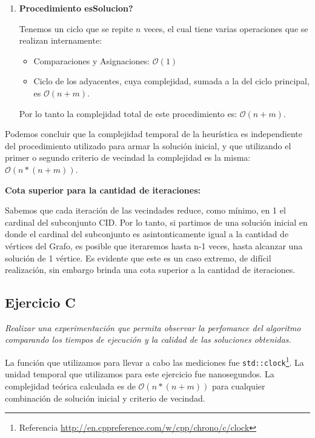 \begin{enumerate}
  \item \textbf{Procedimiento esSolucion?}

    Tenemos un ciclo que se repite $n$ veces, el cual tiene varias operaciones que se realizan internamente:
  \begin{itemize}
    \item Comparaciones y Asignaciones: $\mathcal{O}(1)$
    \item Ciclo de los adyacentes, cuya complejidad, sumada a la del ciclo principal, es $\mathcal{O}(n + m)$.
  \end{itemize}
  Por lo tanto la complejidad total de este procedimiento es: $\mathcal{O}(n + m)$.

\end{enumerate}

Podemos concluir que la complejidad temporal de la heurística es independiente del procedimiento utilizado para armar la solución inicial, y que utilizando el primer o segundo criterio de vecindad la complejidad es la misma: $\mathcal{O}(n*(n + m))$.\\

\medskip

\textbf{Cota superior para la cantidad de iteraciones:}
\medskip

Sabemos que cada iteración de las vecindades reduce, como mínimo, en 1 el cardinal del subconjunto CID. Por lo tanto, si partimos de una solución inicial en donde el cardinal del subconjunto es asintonticamente igual a la cantidad de vértices del Grafo, es posible que iteraremos hasta n-1 veces, hasta alcanzar una solución de 1 vértice. Es evidente que este es un caso extremo, de difícil realización, sin embargo brinda una cota superior a la cantidad de iteraciones.

\subsection{Ejercicio C}

\textit{Realizar una experimentación que permita observar la perfomance del algoritmo comparando los tiempos de ejecución y la calidad de las soluciones obtenidas.}

\medskip

La función que utilizamos para llevar a cabo las mediciones fue \texttt{std::clock}\footnote{Referencia \url{http://en.cppreference.com/w/cpp/chrono/c/clock}}. La unidad temporal que utilizamos para este ejercicio fue nanosegundos.
La complejidad teórica calculada es de $\mathcal{O}(n*(n + m))$ para cualquier combinación de solución inicial y criterio de vecindad.

